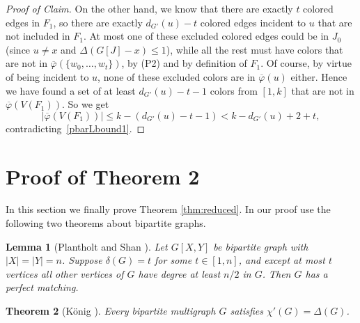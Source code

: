 \documentclass[11pt, oneside]{article}
\newcommand{\pbar}{\overline{\varphi}}
\newtheorem{theorem}{Theorem}
\newtheorem{lemma}[theorem]{Lemma}
\newenvironment{proofc}{\begin{proof}[Proof of Claim]}{\end{proof}}
\begin{document}
\begin{proofc}
On the other hand, we know that there are exactly $t$ colored edges in $F_1$,  so there are exactly $d_{G'}(u)-t$ colored edges incident to $u$ that are not included in $F_1$. At most one of these excluded colored edges could be in $J_0$ (since $u\neq x$ and $\Delta(G[J]-x) \le 1$), while all the rest must have colors that are not in $\pbar(\{w_0, \ldots, w_t\})$, by (P2) and by definition of $F_1$. Of course, by virtue of being incident to $u$, none of these excluded colors are in $\pbar(u)$ either. Hence we have found a set of at least $d_{G'}(u)-t-1$ colors from $[1,k]$ that are not in $\pbar(V(F_1))$. So we get 
$$|\pbar(V(F_1))| \leq k-(d_{G'}(u)-t-1)< k-d_{G'}(u)+ 2+ t,$$
contradicting~\eqref{pbarLbound1}. 
\end{proofc}


































 

\section{Proof of Theorem 2}\label{sec:Theorem1}

In this section we finally prove Theorem \ref{thm:reduced}. In our proof use the following two theorems about bipartite graphs.


\begin{lemma}[Plantholt and Shan \cite{PS2023}]\label{lem:matching-in-bipartite}
	Let $G[X,Y]$ be bipartite graph with $|X|=|Y|=n$. Suppose $\delta(G)=t$ 
for some $t\in [1,n]$, 
	and except at most $t$ vertices all other vertices of $G$ have degree 
	at least $n/2$ in $G$. Then 
	$G$ has a perfect matching. 
\end{lemma}


\begin{theorem}[K\"{o}nig \cite{MR1511872}]\label{thm:konig}
	Every bipartite multigraph $G$ satisfies $\chi'(G)=\Delta(G)$. 
\end{theorem}
\end{document}
